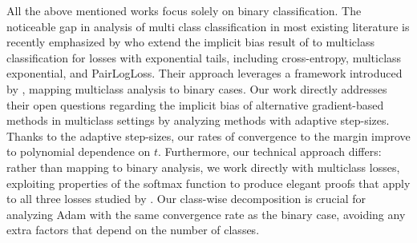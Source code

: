 All the above mentioned works focus solely on binary classification. The noticeable gap in analysis of multi class classification in most existing literature is  recently emphasized by \cite{ravi2024implicit} who extend the implicit bias result of \cite{soudry2018implicit} to multiclass classification for losses with exponential tails, including cross-entropy, multiclass exponential, and PairLogLoss. Their approach leverages a framework introduced by \cite{wang2024unified}, mapping multiclass analysis to binary cases. Our work directly addresses their open questions regarding the implicit bias of alternative gradient-based methods in multiclass settings by analyzing methods with adaptive step-sizes. Thanks to the adaptive step-sizes, our rates of convergence to the margin improve to polynomial dependence on $t$. Furthermore, our technical approach differs: rather than mapping to binary analysis, we work directly with multiclass losses, exploiting properties of the softmax function to produce elegant proofs that apply to all three losses studied by \cite{ravi2024implicit}. Our class-wise decomposition is crucial for analyzing Adam with the same convergence rate as the binary case, avoiding any extra factors that depend on the number of classes.




